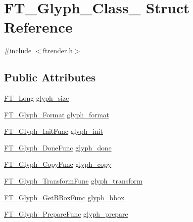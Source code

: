 \hypertarget{struct_f_t___glyph___class__}{}\section{F\+T\+\_\+\+Glyph\+\_\+\+Class\+\_\+ Struct Reference}
\label{struct_f_t___glyph___class__}


{\ttfamily \#include $<$ftrender.\+h$>$}

\subsection*{Public Attributes}
\begin{DoxyCompactItemize}
\item 
\mbox{\hyperlink{fttypes_8h_a7fa72a1f0e79fb1860c5965789024d6f}{F\+T\+\_\+\+Long}} \mbox{\hyperlink{struct_f_t___glyph___class___a1a76c68b9fb0e93947e888c0fe77cbf8}{glyph\+\_\+size}}
\item 
\mbox{\hyperlink{ftimage_8h_aeca0d10a27aedecbf96515e0628aff1f}{F\+T\+\_\+\+Glyph\+\_\+\+Format}} \mbox{\hyperlink{struct_f_t___glyph___class___a26738bd14d5845e18d09ccaa3a709d23}{glyph\+\_\+format}}
\item 
\mbox{\hyperlink{ftrender_8h_a55b3628735bbb8ac0d485aec0f6ff737}{F\+T\+\_\+\+Glyph\+\_\+\+Init\+Func}} \mbox{\hyperlink{struct_f_t___glyph___class___a657200ad15ff061b38fb25b168737f95}{glyph\+\_\+init}}
\item 
\mbox{\hyperlink{ftrender_8h_a1e2936ce7a25061111dc3bfbeef20026}{F\+T\+\_\+\+Glyph\+\_\+\+Done\+Func}} \mbox{\hyperlink{struct_f_t___glyph___class___aabf05a4368dccacf45e1a54e542e5d63}{glyph\+\_\+done}}
\item 
\mbox{\hyperlink{ftrender_8h_a6d431bb14581040ff97ab1f695ac5f6b}{F\+T\+\_\+\+Glyph\+\_\+\+Copy\+Func}} \mbox{\hyperlink{struct_f_t___glyph___class___afc78dcdc4802760ebcaccf3a7b6cd088}{glyph\+\_\+copy}}
\item 
\mbox{\hyperlink{ftrender_8h_a6e39ad832662366565c93c53cf56fd0d}{F\+T\+\_\+\+Glyph\+\_\+\+Transform\+Func}} \mbox{\hyperlink{struct_f_t___glyph___class___a5f72ac1d0d92eb31fa3e2bb721a97ef2}{glyph\+\_\+transform}}
\item 
\mbox{\hyperlink{ftrender_8h_aba35e5441765cabf71e6ccdc248dac5c}{F\+T\+\_\+\+Glyph\+\_\+\+Get\+B\+Box\+Func}} \mbox{\hyperlink{struct_f_t___glyph___class___a06bfad431865c6731305cb781f78b317}{glyph\+\_\+bbox}}
\item 
\mbox{\hyperlink{ftrender_8h_ad8be01ff60862457d78927ebf1b90199}{F\+T\+\_\+\+Glyph\+\_\+\+Prepare\+Func}} \mbox{\hyperlink{struct_f_t___glyph___class___af7f406e5ea20a6614c946746938830c9}{glyph\+\_\+prepare}}
\end{DoxyCompactItemize}


